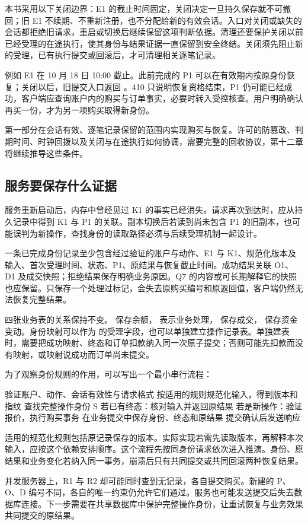 本书采用以下关闭边界：E1 的截止时间固定，关闭决定一旦持久保存就不可撤回；旧 E1 不续期、不重新注册，也不分配给新的有效会话。入口对关闭或缺失的会话都拒绝旧请求，重启或切换后继续保留这项判断依据。清理还要保护关闭以前已经受理的在途执行，使其身份与结果证据一直保留到安全终结。关闭须先阻止新的受理，已有执行提交或回滚后，才可清理相关逐笔记录。



例如 E1 在 10 月 18 日 10:00 截止。此前完成的 P1 可以在有效期内按原身份恢复；关闭以后，旧提交入口返回 。410 只说明恢复资格结束，P1 仍可能已经成功，客户端应查询账户内的购买与订单事实，必要时转入受控核查。用户明确确认再买一份，才为另一项购买取得新身份。

第一部分在会话有效、逐笔记录保留的范围内实现购买与恢复。许可的防篡改、判期时间、时钟回拨以及关闭与在途执行如何协调，需要完整的回收协议，第十二章将继续推导这些条件。

\subsection*{服务要保存什么证据}

服务重新启动后，内存中曾经见过 K1 的事实已经消失。请求再次到达时，应从持久记录中得到 K1 与 P1 的关联。副本切换后若读到尚未包含 P1 的旧副本，也可能误判为新操作，查找身份的读取路径必须与后续受理机制一起设计。

一条已完成身份记录至少包含经过验证的账户与动作、E1 与 K1、规范化版本及输入、首次受理时间、状态、P1、原结果与恢复截止时间。成功结果关联 O1、D1 及成交快照；拒绝结果保存明确业务原因。Q7 的内容或可长期解释它的快照也应保留。只保存一个处理过标记，会失去原购买编号和原返回值，客户端仍然无法恢复完整结果。

四张业务表的关系保持不变。 保存余额， 表示业务处理， 保存成交， 保存资金变动。身份映射可以作为  的受理字段，也可以单独建立操作记录表。单独建表时，需要把成功映射、终态和订单扣款纳入同一次原子提交；否则可能先扣款而没有映射，或映射说成功而订单尚未提交。



\FloatBarrier
为了观察身份规则的作用，可以写出一个最小串行流程：
\begin{BookCode}
验证账户、动作、会话有效性与请求格式
按适用的规则规范化输入，得到版本和指纹
查找完整操作身份 S
若已有终态：核对输入并返回原结果
若是新操作：验证报价，执行购买事务
在业务提交中保存身份、终态和原结果
提交确认后发送响应
\end{BookCode}

适用的规范化规则包括原记录保存的版本。实际实现若需先读取版本，再解释本次输入，应按这个依赖安排顺序。这个流程先按同身份请求依次进入推演。身份、原结果和业务变化若纳入同一事务，崩溃后只有共同提交或共同回滚两种恢复结果。

并发服务器上，R1 与 R2 却可能同时查到无记录，各自提交购买。新建的 P、O、D 编号不同，各自的唯一约束仍允许它们通过。服务也可能发送提交后失去数据库连接。下一步需要在共享数据库中保护完整操作身份，让重试恢复与业务效果共同提交的原结果。
\FloatBarrier
